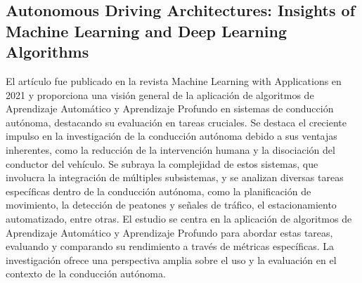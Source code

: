 
\setcounter{secnumdepth}{0}
\noindent
\subsection{
    \textbf{Autonomous Driving Architectures: Insights of Machine Learning and Deep Learning Algorithms}
    ~\cite{bachute2021autonomous}
}\label{subsec:auto-driving-architectures}
El artículo fue publicado en la revista Machine Learning with Applications en 2021 y
proporciona una visión general de la aplicación de algoritmos de Aprendizaje Automático y Aprendizaje Profundo
en sistemas de conducción autónoma, destacando su evaluación en tareas cruciales.
Se destaca el creciente impulso en la investigación de la conducción autónoma debido a sus ventajas inherentes, como la reducción
de la intervención humana y la disociación del conductor del vehículo.
Se subraya la complejidad de estos sistemas,
que involucra la integración de múltiples subsistemas, y se analizan diversas tareas específicas dentro de la conducción autónoma,
como la planificación de movimiento, la detección de peatones y señales de tráfico, el estacionamiento automatizado, entre otras.
El estudio se centra en la aplicación de algoritmos de Aprendizaje Automático y Aprendizaje Profundo para abordar estas tareas,
evaluando y comparando su rendimiento a través de métricas específicas. La investigación ofrece una perspectiva amplia sobre el uso
y la evaluación en el contexto de la conducción autónoma.
